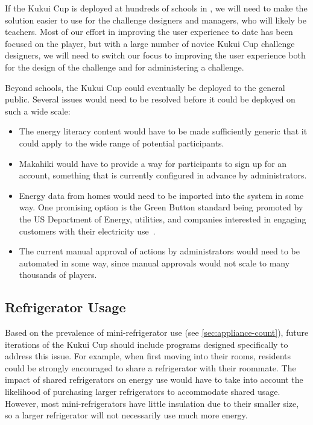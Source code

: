 If the Kukui Cup is deployed at hundreds of schools in \Hawaii, we will need to make the solution easier to use for the challenge designers and managers, who will likely be teachers. Most of our effort in improving the user experience to date has been focused on the player, but with a large number of novice Kukui Cup challenge designers, we will need to switch our focus to improving the user experience both for the design of the challenge and for administering a challenge.

Beyond schools, the Kukui Cup could eventually be deployed to the general public. Several issues would need to be resolved before it could be deployed on such a wide scale:

\begin{itemize}
	\item The energy literacy content would have to be made sufficiently generic that it could apply to the wide range of potential participants.
	\item Makahiki would have to provide a way for participants to sign up for an account, something that is currently configured in advance by administrators.
	\item Energy data from homes would need to be imported into the system in some way. One promising option is the Green Button standard being promoted by the US Department of Energy, utilities, and companies interested in engaging customers with their electricity use~\cite{green-button}.
	\item The current manual approval of actions by administrators would need to be automated in some way, since manual approvals would not scale to many thousands of players.
\end{itemize}


\subsection{Refrigerator Usage}

Based on the prevalence of mini-refrigerator use (see \autoref{sec:appliance-count}), future iterations of the Kukui Cup should include programs designed specifically to address this issue. For example, when first moving into their rooms, residents could be strongly encouraged to share a refrigerator with their roommate. The impact of shared refrigerators on energy use would have to take into account the likelihood of purchasing larger refrigerators to accommodate shared usage. However, most mini-refrigerators have little insulation due to their smaller size, so a larger refrigerator will not necessarily use much more energy.
